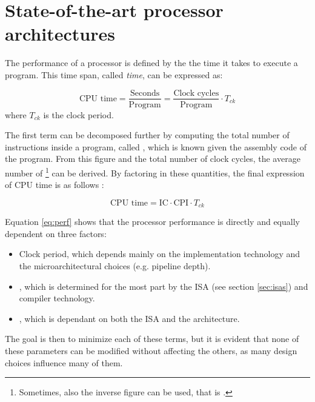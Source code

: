 \chapter{State-of-the-art processor architectures}
The performance of a processor is defined by the the time it takes to execute a program. This time span, called \emph{ time}, can be expressed as:

\begin{equation*}
  \text{CPU time} = \frac{\text{Seconds}}{\text{Program}} = \frac{\text{Clock cycles}}{\text{Program}} \cdot T_{ck}
\end{equation*}
where $T_{ck}$ is the clock period.

The first term can be decomposed further by computing the total number of instructions inside a program, called , which is known given the assembly code of the program. From this figure and the total number of clock cycles, the average number of \footnote{Sometimes, also the inverse figure can be used, that is .} can be derived. By factoring in these quantities, the final expression of \ac{CPU} time is as follows \cite[p.~53]{hennessy17}:

\begin{equation}\label{eq:perf}
  \text{CPU time} = \text{IC} \cdot \text{CPI} \cdot T_{ck} 
\end{equation}

Equation \eqref{eq:perf} shows that the processor performance is directly and equally dependent on three factors:
\begin{itemize}
  \item Clock period, which depends mainly on the implementation technology and the microarchitectural choices (e.g. pipeline depth).
  \item {}, which is determined for the most part by the \ac{ISA} (see section \ref{sec:isas}) and compiler technology.
  \item {}, which is dependant on both the \ac{ISA} and the architecture.
\end{itemize}
The goal is then to minimize each of these terms, but it is evident that none of these parameters can be modified without affecting the others, as many design choices influence many of them.

